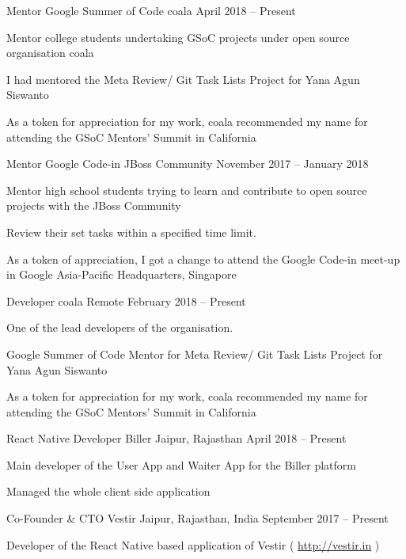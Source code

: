 \begin{cventries}
	\cventry
	{Mentor}
	{Google Summer of Code}
	{coala}
	{April 2018 – Present}
	{\begin{cvitems}
		\item {Mentor college students undertaking GSoC projects under open source organisation coala}
		\item {I had mentored the Meta Review/ Git Task Lists Project for Yana Agun Siswanto}
		\item {As a token for appreciation for my work, coala recommended my name for attending the GSoC Mentors' Summit in California}
		\end{cvitems}}
		
	\cventry
	{Mentor}
	{Google Code-in}
	{JBoss Community}
	{November 2017 – January 2018}
	{\begin{cvitems}
		\item {Mentor high school students trying to learn and contribute to open source projects with the JBoss Community}
		\item {Review their set tasks within a specified time limit.}
		\item {As a token of appreciation, I got a change to attend the Google Code-in meet-up in Google Asia-Pacific Headquarters, Singapore}
		\end{cvitems}}
		
	\cventry
	{Developer}
	{coala}
	{Remote}
	{February 2018 – Present}
	{\begin{cvitems}
		\item {One of the lead developers of the organisation.}
		\item {Google Summer of Code Mentor for Meta Review/ Git Task Lists Project for Yana Agun Siswanto}
		\item {As a token for appreciation for my work, coala recommended my name for attending the GSoC Mentors' Summit in California}
		\end{cvitems}}
		
	\cventry
	{React Native Developer}
	{Biller}
	{Jaipur, Rajasthan}
	{April 2018 – Present}
	{\begin{cvitems}
		\item {Main developer of the User App and Waiter App for the Biller platform}
		\item {Managed the whole client side application}
		\end{cvitems}}
		
    \cventry
	{Co-Founder \& CTO}
	{Vestir}
	{Jaipur, Rajasthan, India}
	{September 2017 – Present}
    {\begin{cvitems}
    {Developer of the React Native based application of Vestir ( \url{http://vestir.in} )}
    \end{cvitems}}
    

\end{cventries}
